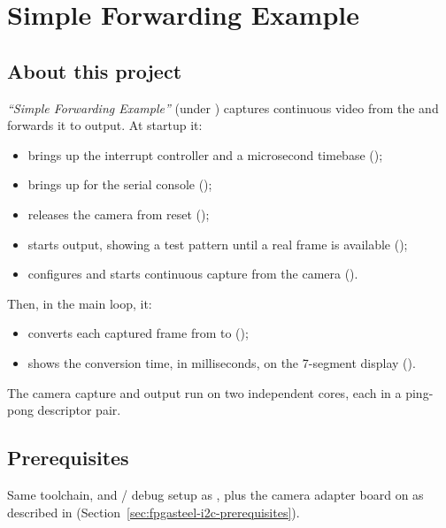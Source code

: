 \chapter{Simple Forwarding Example}
\label{chap:fpgasteel-simple-forwarding}

\section{About this project}
\label{sec:fpgasteel-simple-forwarding-about}

\textit{``Simple Forwarding Example''} (under ) captures continuous video from the  and forwards it to  output. At startup it:

\begin{itemize}
    \item brings up the interrupt controller and a microsecond timebase ();
    \item brings up  for the serial console ();
    \item releases the camera from reset ();
    \item starts  output, showing a test pattern until a real frame is available ();
    \item configures and starts continuous  capture from the camera ().
\end{itemize}

Then, in the main loop, it:

\begin{itemize}
    \item converts each captured frame from  to  ();
    \item shows the conversion time, in milliseconds, on the 7-segment display ().
\end{itemize}

The camera capture and  output run on two independent  cores, each in a ping-pong descriptor pair.

\section{Prerequisites}
\label{sec:fpgasteel-simple-forwarding-prerequisites}

Same toolchain,  and / debug setup as , plus the  camera adapter board on  as described in  (Section~\ref{sec:fpgasteel-i2c-prerequisites}).

